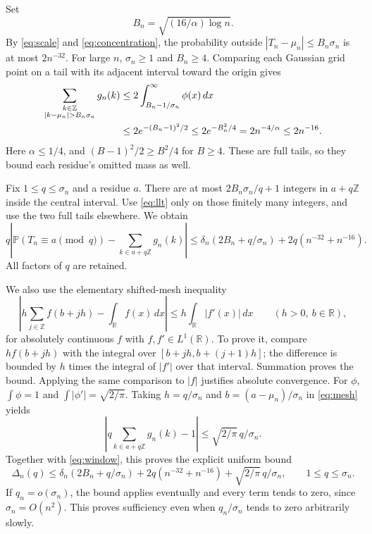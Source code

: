 \documentclass[11pt]{article}
\newcommand{\Pp}{\mathbb P}
\newcommand{\R}{\mathbb R}
\newcommand{\Z}{\mathbb Z}
\begin{document}
Set
\[
 B_n=\sqrt{(16/\alpha)\log n}.
\]
By \eqref{eq:scale} and \eqref{eq:concentration}, the probability outside
\(|T_n-\mu_n|\leq B_n\sigma_n\) is at most \(2n^{-32}\).
For large \(n\), \(\sigma_n\geq1\) and \(B_n\geq4\).
Comparing each Gaussian grid point on a tail with its adjacent interval
toward the origin gives
\begin{align}
 \sum_{\substack{k\in\Z\\|k-\mu_n|>B_n\sigma_n}}g_n(k)
 &\leq2\int_{B_n-1/\sigma_n}^{\infty}\phi(x)\,dx \notag\\
 &\leq2e^{-(B_n-1)^2/2}
 \leq2e^{-B_n^2/4}
 =2n^{-4/\alpha}\leq2n^{-16}. \label{eq:gausstail}
\end{align}
Here \(\alpha\leq1/4\), and
\((B-1)^2/2\geq B^2/4\) for \(B\geq4\). These are full tails, so they
bound each residue's omitted mass as well.

Fix \(1\leq q\leq\sigma_n\) and a residue \(a\). There are at most
\(2B_n\sigma_n/q+1\) integers in \(a+q\Z\) inside the central interval.
Use \eqref{eq:llt} only on those finitely many integers, and use the two
full tails elsewhere. We obtain
\begin{equation}\label{eq:window}
 q\left|\Pp(T_n\equiv a\pmod q)
                  -\sum_{k\in a+q\Z}g_n(k)\right|
 \leq\delta_n(2B_n+q/\sigma_n)+2q(n^{-32}+n^{-16}).
\end{equation}
All factors of \(q\) are retained.

We also use the elementary shifted-mesh inequality
\begin{equation}\label{eq:mesh}
 \left|h\sum_{j\in\Z}f(b+jh)-\int_{\R}f(x)\,dx\right|
       \leq h\int_{\R}|f'(x)|\,dx
       \qquad(h>0,\ b\in\R),
\end{equation}
for absolutely continuous \(f\) with \(f,f'\in L^1(\R)\).
To prove it, compare \(h f(b+jh)\) with the integral over
\([b+jh,b+(j+1)h]\); the difference is bounded by \(h\) times the
integral of \(|f'|\) over that interval. Summation proves the bound.
Applying the same comparison to \(|f|\) justifies absolute convergence.
For \(\phi\), \(\int\phi=1\) and
\(\int|\phi'|=\sqrt{2/\pi}\). Taking \(h=q/\sigma_n\) and
\(b=(a-\mu_n)/\sigma_n\) in \eqref{eq:mesh} yields
\[
 \left|q\sum_{k\in a+q\Z}g_n(k)-1\right|
           \leq\sqrt{2/\pi}\,q/\sigma_n .
\]
Together with \eqref{eq:window}, this proves the explicit uniform bound
\begin{equation}\label{eq:discrepancy}
 \Delta_n(q)\leq
 \delta_n(2B_n+q/\sigma_n)
 +2q(n^{-32}+n^{-16})+\sqrt{2/\pi}\,q/\sigma_n,
 \qquad 1\leq q\leq\sigma_n .
\end{equation}
If \(q_n=o(\sigma_n)\), the bound applies eventually and every term tends
to zero, since \(\sigma_n=O(n^2)\).
This proves sufficiency even when \(q_n/\sigma_n\) tends to zero
arbitrarily slowly.
\end{document}
